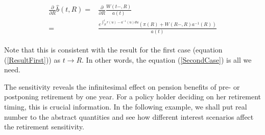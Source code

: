 \documentclass{article}
\newcommand{\1}[1]{\mathbbm{1}_{\left\lbrace #1 \right\rbrace}}
\theoremstyle{break}
\theoremstyle{remark}
\numberwithin{equation}{section}
\begin{document}
\begin{align} \label{SecondCase}
\begin{split}
	\frac{\partial}{\partial R} \hat{b}(t,R) =& \frac{\partial}{\partial R} \frac{W(t-,R)}{a(t)} \\ =& \frac{e^{\int_R^t r(u) - a^{-1}(u) du} \left( \pi (R) + W(R-,R) a^{-1}(R) \right)}{a(t)}
\end{split}
\end{align}

Note that this is consistent with the result for the first case (equation (\ref{ResultFirst})) as $t \to R$. In other words, the equation (\ref{SecondCase}) is all we need.

The sensitivity reveals the infinitesimal effect on pension benefits of pre- or postponing retirement by one year. For a policy holder deciding on her retirement timing, this is crucial information. In the following example, we shall put real number to the abstract quantities and see how different interest scenarios affect the retirement sensitivity.
\end{document}
